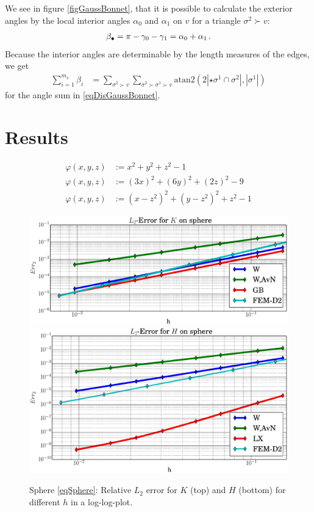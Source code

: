     We see in figure \ref{figGaussBonnet}, that it is possible to calculate the exterior angles by the local interior angles 
    \( \alpha_{0} \) and \( \alpha_{1} \) on \( v \) for a
    triangle \( \sigma^{2}\succ v \):
    \begin{align}
      \beta_{\bullet} = \pi - \gamma_{0} - \gamma_{1} = \alpha_{0} + \alpha_{1} \,\text{.}
    \end{align}
    Because the interior angles are determinable by the length measures of the edges, we get 
    \begin{align}
      \sum_{i=1}^{m_{v}}\beta_{i} &= \sum_{\sigma^{2}\succ v} \sum_{\sigma^{2}\succ\sigma^{1}\succ v}
                               \text{atan2}\left( 2\left|\star\sigma^{1} \cap \sigma^{2} \right|, 
                                 \left|\sigma^{1}\right|\right)
    \end{align}
    for the angle sum in \eqref{eqDisGaussBonnet}.



\section{Results} \label{secResults}
  
  \begin{align}
    \label{eqSphere}
    \varphi\left( x,y,z \right) &:= x^{2} + y^{2} + z^{2} - 1 \\
    \label{eqEllipsoid}
    \varphi\left( x,y,z \right) &:= \left( 3x \right)^{2} + \left( 6y \right)^{2} + \left( 2z \right)^{2} - 9\\
    \label{eqQuartic}
    \varphi\left( x,y,z \right) &:= \left( x - z^{2} \right)^{2} + \left( y - z^{2} \right)^{2} + z^{2} - 1
  \end{align}


  \begin{figure}
    \centering\includegraphics[width=.49\textwidth]{bilder/sphere/L2K.eps}
    \centering\includegraphics[width=.49\textwidth]{bilder/sphere/L2H.eps}
    \caption{Sphere \eqref{eqSphere}: Relative \( L_{2} \) error for \( K \) (top) and
                                                     \( H \) (bottom) for different \( h \) in a log-log-plot.}
    \label{figSphereL2Err}
  \end{figure}

